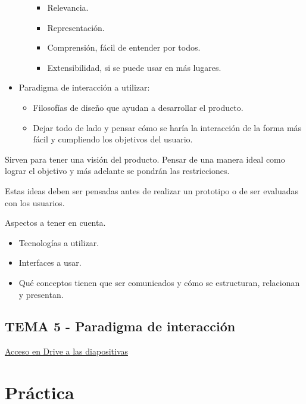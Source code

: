 \documentclass[12pt, twoside, openright]{report} %
\begin{document}
\begin{itemize}
\begin{itemize}
\begin{itemize}
			            \item Relevancia.

			            \item Representación.

			            \item Comprensión, fácil de entender por todos.

			            \item Extensibilidad, si se puede usar en más lugares.
		            \end{itemize}
	      \end{itemize}
	\item Paradigma de interacción a utilizar:

	      \begin{itemize}
		      \item Filosofías de diseño que ayudan a desarrollar el producto.

		      \item Dejar todo de lado y pensar cómo se haría la interacción de la
		            forma más fácil y cumpliendo los objetivos del usuario.
	      \end{itemize}
\end{itemize}

Sirven para tener una visión del producto. Pensar de una manera
ideal como lograr el objetivo y más adelante se pondrán las
restricciones.

Estas ideas deben ser pensadas antes de realizar un prototipo o de
ser evaluadas con los usuarios.

Aspectos a tener en cuenta.

\begin{itemize}
	\item Tecnologías a utilizar.
	\item Interfaces a usar.
	\item Qué conceptos tienen que ser comunicados y cómo se estructuran,
	      relacionan y presentan.
\end{itemize}

\chapter{TEMA 5 - Paradigma de interacción}

\href{https://drive.google.com/file/d/1cRk-uARzOR5F4dXptDtSAgrnZd1r5JDq}{Acceso en Drive a las diapositivas}

\part{Práctica}
\end{document}
